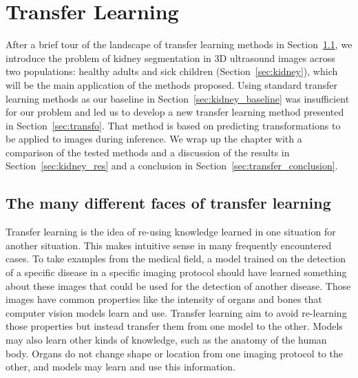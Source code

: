 \chapter{Transfer Learning}
\label{chap:transfer}

\begin{chapabstract}
After a brief tour of the landscape of transfer learning methods in Section~\ref{sec:transfer}, we introduce the problem of kidney segmentation in 3D ultrasound images across two populations: healthy adults and sick children (Section~\ref{sec:kidney}), which will be the main application of the methods proposed. Using standard transfer learning methods as our baseline in Section~\ref{sec:kidney_baseline} was insufficient for our problem and led us to develop a new transfer learning method presented in Section~\ref{sec:transfo}. That method is based on predicting transformations to be applied to images during inference. We wrap up the chapter with a comparison of the tested methods and a discussion of the results in Section~\ref{sec:kidney_res} and a conclusion in Section~\ref{sec:transfer_conclusion}.
\end{chapabstract}

\vspace{1cm}

{   
    \minitoc
}
\newpage

\section{The many different faces of transfer learning}
\label{sec:transfer}

Transfer learning is the idea of re-using knowledge learned in one situation for another situation. This makes intuitive sense in many frequently encountered cases. To take examples from the medical field, a model trained on the detection of a specific disease in a specific imaging protocol should have learned something about these images that could be used for the detection of another disease. Those images have common properties like the intensity of organs and bones that computer vision models learn and use. Transfer learning aim to avoid re-learning those properties but instead transfer them from one model to the other. Models may also learn other kinds of knowledge, such as the anatomy of the human body. Organs do not change shape or location from one imaging protocol to the other, and models may learn and use this information.

